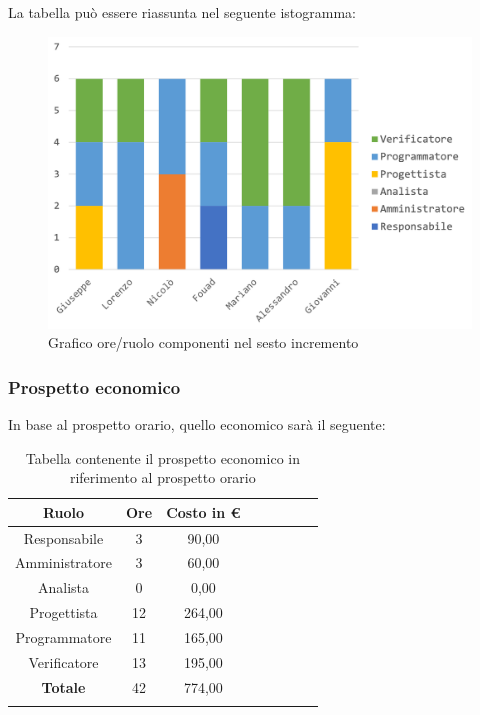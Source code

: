 		La tabella può essere riassunta nel seguente istogramma:
		\begin{figure}[H]
			\centering
			\includegraphics[width=0.8\linewidth]{./images/preventivo/incremento6-1.png}
			\caption{Grafico ore/ruolo componenti nel sesto incremento}
			\label{fig:grafico suddivione ruoli incremento VI}
		\end{figure}
		
		\subsubsection{Prospetto economico}
		In base al prospetto orario, quello economico sarà il seguente: 
		
		\begin{longtable}{|c|c|c|c|c|c|c|c|}
			\hline
			\rowcolor{lighter-grayer}
			\textbf{Ruolo} & \textbf{Ore} & \textbf{Costo in € } \\
			\hline
			\endfirsthead
			
			\hline
			Responsabile 	    & 3 & 90,00\\
			\hline 
			\hline
			Amministratore	   & 3 & 60,00\\
			\hline
			\hline
			Analista 				& 0 & 0,00\\
			\hline
			\hline
			Progettista 		   & 12 & 264,00\\
			\hline
			\hline
			Programmatore 	  & 11 & 165,00\\
			\hline
			\hline
			Verificatore 		   & 13 & 195,00\\
			\hline
			\textbf{Totale} 	 & 42 & 774,00\\
			\hline
			\caption{Tabella contenente il prospetto economico in riferimento al prospetto orario}
		\end{longtable}
		\pagebreak
		
